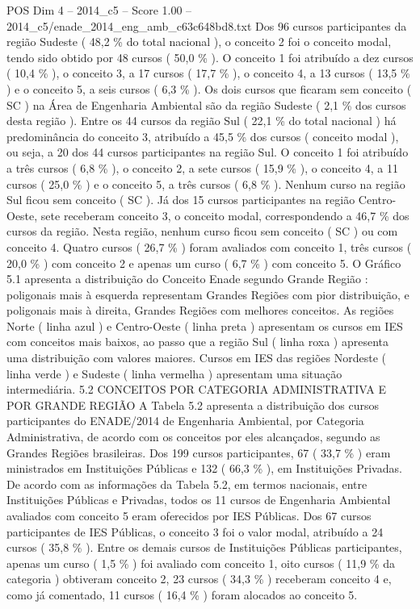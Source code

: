 \begin{textsample}{POS Dim 4 – 2014\_c5 – Score 1.00 – 2014\_c5/enade\_2014\_eng\_amb\_c63c648bd8.txt}
Dos 96 cursos participantes da região Sudeste ( 48,2 \% do total nacional ), o conceito 2 foi o conceito modal, tendo sido obtido por 48 cursos ( 50,0 \% ).
O conceito 1 foi atribuído a dez cursos ( 10,4 \% ), o conceito 3, a 17 cursos ( 17,7 \% ), o conceito 4, a 13 cursos ( 13,5 \% ) e o conceito 5, a seis cursos ( 6,3 \% ).
Os dois cursos que ficaram sem conceito ( SC ) na Área de Engenharia Ambiental são da região Sudeste ( 2,1 \% dos cursos desta região ).
Entre os 44 cursos da região Sul ( 22,1 \% do total nacional ) há predominância do conceito 3, atribuído a 45,5 \% dos cursos ( conceito modal ), ou seja, a 20 dos 44 cursos participantes na região Sul.
O conceito 1 foi atribuído a três cursos ( 6,8 \% ), o conceito 2, a sete cursos ( 15,9 \% ), o conceito 4, a 11 cursos ( 25,0 \% ) e o conceito 5, a três cursos ( 6,8 \% ).
Nenhum curso na região Sul ficou sem conceito ( SC ).
Já dos 15 cursos participantes na região Centro-Oeste, sete receberam conceito 3, o conceito modal, correspondendo a 46,7 \% dos cursos da região.
Nesta região, nenhum curso ficou sem conceito ( SC ) ou com conceito 4.
Quatro cursos ( 26,7 \% ) foram avaliados com conceito 1, três cursos ( 20,0 \% ) com conceito 2 e apenas um curso ( 6,7 \% ) com conceito 5.
O Gráfico 5.1 apresenta a distribuição do Conceito Enade segundo Grande Região : poligonais mais à esquerda representam Grandes Regiões com pior distribuição, e poligonais mais à direita, Grandes Regiões com melhores conceitos.
As regiões Norte ( linha azul ) e Centro-Oeste ( linha preta ) apresentam os cursos em IES com conceitos mais baixos, ao passo que a região Sul ( linha roxa ) apresenta uma distribuição com valores maiores.
Cursos em IES das regiões Nordeste ( linha verde ) e Sudeste ( linha vermelha ) apresentam uma situação intermediária. 5.2 CONCEITOS POR CATEGORIA ADMINISTRATIVA E POR GRANDE REGIÃO A Tabela 5.2 apresenta a distribuição dos cursos participantes do ENADE/2014 de Engenharia Ambiental, por Categoria Administrativa, de acordo com os conceitos por eles alcançados, segundo as Grandes Regiões brasileiras.
Dos 199 cursos participantes, 67 ( 33,7 \% ) eram ministrados em Instituições Públicas e 132 ( 66,3 \% ), em Instituições Privadas.
De acordo com as informações da Tabela 5.2, em termos nacionais, entre Instituições Públicas e Privadas, todos os 11 cursos de Engenharia Ambiental avaliados com conceito 5 eram oferecidos por IES Públicas.
Dos 67 cursos participantes de IES Públicas, o conceito 3 foi o valor modal, atribuído a 24 cursos ( 35,8 \% ).
Entre os demais cursos de Instituições Públicas participantes, apenas um curso ( 1,5 \% ) foi avaliado com conceito 1, oito cursos ( 11,9 \% da categoria ) obtiveram conceito 2, 23 cursos ( 34,3 \% ) receberam conceito 4 e, como já comentado, 11 cursos ( 16,4 \% ) foram alocados ao conceito 5.

\end{textsample}
